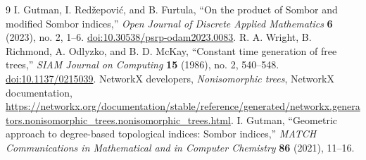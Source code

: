 \documentclass[11pt,a4paper]{article}
\numberwithin{equation}{section}
\begin{document}
\begin{thebibliography}{9}\setlength{\itemsep}{3pt}
 I. Gutman, I. Red\v{z}epovi\'{c}, and B. Furtula, ``On the product of Sombor and modified Sombor indices,'' \emph{Open Journal of Discrete Applied Mathematics} \textbf{6} (2023), no. 2, 1--6. \href{https://doi.org/10.30538/psrp-odam2023.0083}{doi:10.30538/psrp-odam2023.0083}.
 R. A. Wright, B. Richmond, A. Odlyzko, and B. D. McKay, ``Constant time generation of free trees,'' \emph{SIAM Journal on Computing} \textbf{15} (1986), no. 2, 540--548. \href{https://doi.org/10.1137/0215039}{doi:10.1137/0215039}.
 NetworkX developers, \emph{Nonisomorphic trees}, NetworkX documentation, \url{https://networkx.org/documentation/stable/reference/generated/networkx.generators.nonisomorphic_trees.nonisomorphic_trees.html}.
 I. Gutman, ``Geometric approach to degree-based topological indices: Sombor indices,'' \emph{MATCH Communications in Mathematical and in Computer Chemistry} \textbf{86} (2021), 11--16.
\end{thebibliography}
\end{document}
